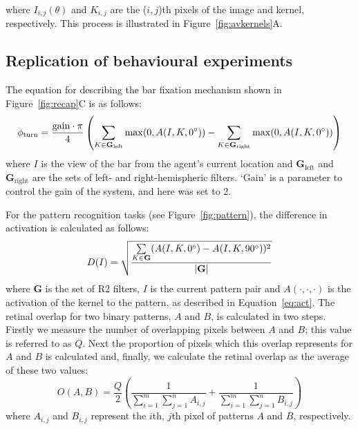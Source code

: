 where $I_{i,j}(\theta)$ and $K_{i,j}$ are the ($i,j$)th pixels of the image and kernel, respectively. This process is illustrated in Figure~\ref{fig:avkernels}A.

\subsection*{Replication of behavioural experiments}
\label{sec:methods:replication}
The equation for describing the bar fixation mechanism shown in Figure~\ref{fig:recap}C is as follows:
$$
\phi_\mathrm{turn} = \frac{\mathrm{gain}\cdot \pi}{4}\left( \sum\limits_{K\in \mathbf{G}_\mathrm{left}}\max(0,A(I,K,0\degree)) - \sum\limits_{K\in \mathbf{G}_\mathrm{right}}\max(0,A(I,K,0\degree)) \right)
$$
where $I$ is the view of the bar from the agent's current location and $\mathbf{G}_\mathrm{left}$ and $\mathbf{G}_\mathrm{right}$ are the sets of left- and right-hemispheric filters. `Gain' is a parameter to control the gain of the system, and here was set to 2.

For the pattern recognition tasks (see Figure~\ref{fig:pattern}), the difference in activation is calculated as follows:
$$
D(I) = \sqrt{\frac{\sum\limits_{K\in \mathbf{G}}(A(I,K,0\degree)-A(I,K,90\degree))^2}{|\mathbf{G}|}}
$$
where $\mathbf{G}$ is the set of R2 filters, $I$ is the current pattern pair and $A(\cdot,\cdot,\cdot)$ is the activation of the kernel to the pattern, as described in Equation~\ref{eq:act}.
The retinal overlap for two binary patterns, $A$ and $B$, is calculated in two steps. Firstly we measure the number of overlapping pixels between $A$ and $B$; this value is referred to as $Q$. Next the proportion of pixels which this overlap represents for $A$ and $B$ is calculated and, finally, we calculate the retinal overlap as the average of these two values:
$$
O(A,B) = \frac{Q}{2} \left( \frac{1}{\sum\limits_{i=1}^m \sum\limits_{j=1}^n A_{i,j}} + \frac{1}{\sum\limits_{i=1}^m \sum\limits_{j=1}^n B_{i,j}} \right)
$$
where $A_{i,j}$ and $B_{i,j}$ represent the $i$th, $j$th pixel of patterns $A$ and $B$, respectively.

